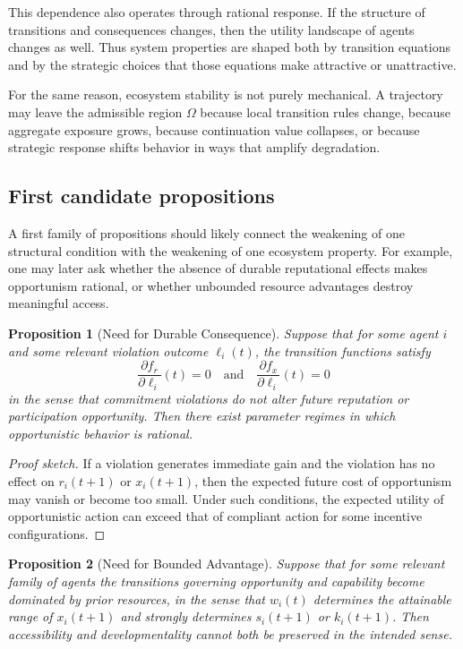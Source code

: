 \documentclass[11pt]{article}
\newtheorem{proposition}{Proposition}
\begin{document}
This dependence also operates through rational response. If the structure of transitions and consequences changes, then the utility landscape of agents changes as well. Thus system properties are shaped both by transition equations and by the strategic choices that those equations make attractive or unattractive.

For the same reason, ecosystem stability is not purely mechanical. A trajectory may leave the admissible region \(\Omega\) because local transition rules change, because aggregate exposure grows, because continuation value collapses, or because strategic response shifts behavior in ways that amplify degradation.

\subsection{First candidate propositions}

A first family of propositions should likely connect the weakening of one structural condition with the weakening of one ecosystem property. For example, one may later ask whether the absence of durable reputational effects makes opportunism rational, or whether unbounded resource advantages destroy meaningful access.

\begin{proposition}[Need for Durable Consequence]
Suppose that for some agent \(i\) and some relevant violation outcome \(\ell_i(t)\), the transition functions satisfy
\[
\frac{\partial f_r}{\partial \ell_i}(t) = 0
\quad\text{and}\quad
\frac{\partial f_x}{\partial \ell_i}(t) = 0
\]
in the sense that commitment violations do not alter future reputation or participation opportunity. Then there exist parameter regimes in which opportunistic behavior is rational.
\end{proposition}

\begin{proof}[Proof sketch]
If a violation generates immediate gain and the violation has no effect on \(r_i(t+1)\) or \(x_i(t+1)\), then the expected future cost of opportunism may vanish or become too small. Under such conditions, the expected utility of opportunistic action can exceed that of compliant action for some incentive configurations.
\end{proof}

\begin{proposition}[Need for Bounded Advantage]
Suppose that for some relevant family of agents the transitions governing opportunity and capability become dominated by prior resources, in the sense that \(w_i(t)\) determines the attainable range of \(x_i(t+1)\) and strongly determines \(s_i(t+1)\) or \(k_i(t+1)\). Then accessibility and developmentality cannot both be preserved in the intended sense.
\end{proposition}
\end{document}
